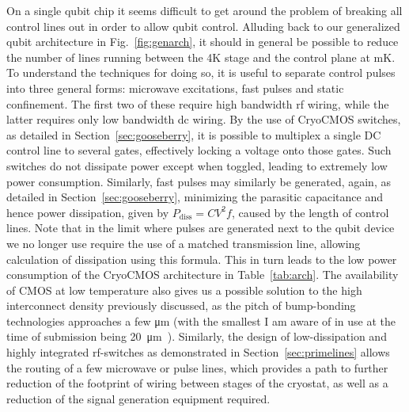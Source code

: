 On a single qubit chip it seems difficult to get around the problem of breaking all control lines out in order to allow qubit control. Alluding
back to our generalized qubit architecture in Fig.~\ref{fig:genarch}, it should in general be possible to reduce the number of lines running between the 4K stage
and the control plane at mK. To understand the techniques for doing so, it is useful to separate control pulses into three general forms: microwave excitations,
fast pulses and static confinement. The first two of these require high bandwidth rf wiring, while the latter requires only low bandwidth dc wiring. By the use of
CryoCMOS switches, as detailed in Section~\ref{sec:gooseberry}, it is possible to multiplex a single DC control line to several gates, effectively locking
a voltage onto those gates. Such switches do not dissipate power except when toggled, leading to extremely low power consumption. Similarly, fast pulses may similarly
be generated, again, as detailed in Section~\ref{sec:gooseberry}, minimizing the parasitic capacitance and hence power dissipation, given by $P_\textrm{diss} = CV^2f$,
caused by the length of control lines. Note that in the limit where pulses are generated next to the qubit device we no longer use require the use of a matched transmission
line, allowing calculation of dissipation using this formula. This in turn leads to the low power consumption of the CryoCMOS architecture in Table~\ref{tab:arch}.
The availability of CMOS at low temperature also gives us a possible solution to the high interconnect density previously discussed, as the pitch of bump-bonding
technologies approaches a few \si{\micro\meter} (with the smallest I am aware of in use at the time of submission being \SI{20}{\micro\meter}~\cite{4550089}).
Similarly, the design of low-dissipation and highly integrated rf-switches as demonstrated in Section~\ref{sec:primelines} allows the routing of a few microwave
or pulse lines, which provides a path to further reduction of the footprint of wiring between stages of the cryostat, as well as a reduction of the signal
generation equipment required.

